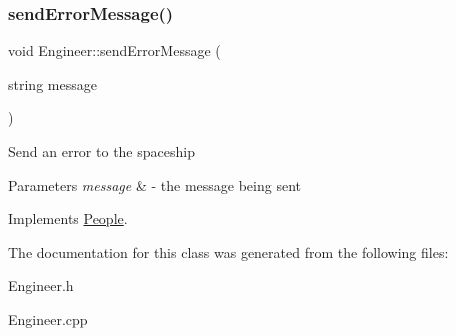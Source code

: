 \subsubsection{\texorpdfstring{send\+Error\+Message()}{sendErrorMessage()}}
{\footnotesize\ttfamily void Engineer\+::send\+Error\+Message (\begin{DoxyParamCaption}\item[{string}]{message }\end{DoxyParamCaption})\hspace{0.3cm}{\ttfamily [virtual]}}

Send an error to the spaceship 
\begin{DoxyParams}{Parameters}
{\em message} & -\/ the message being sent \\
\hline
\end{DoxyParams}


Implements \hyperlink{classPeople_a572a35170f61d1848eb04b65baafb057}{People}.



The documentation for this class was generated from the following files\+:\begin{DoxyCompactItemize}
\item 
Engineer.\+h\item 
Engineer.\+cpp\end{DoxyCompactItemize}
